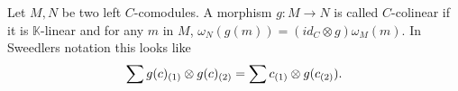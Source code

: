 \documentclass[../thesis.tex]{subfiles}
\begin{document}
\begin{definition}[Comodules]

    
    
    
    
    
    
                        
    
            \end{definition}

            \begin{definition}
                Let $M,N$ be two left $C$-comodules. A morphism $g:M\rightarrow N$ is called $C$-colinear if it is $\mathbb{K}$-linear and for any $m$ in $M$, $\omega_N(g(m)) = (id_C\otimes g)\omega_M(m)$. In Sweedlers notation this looks like
                \begin{align*}
                    \sum g(c)_{(1)}\otimes g(c)_{(2)} = \sum c_{(1)}\otimes g(c_{(2)})\tt{.}
                \end{align*}
            \end{definition}
\end{document}
